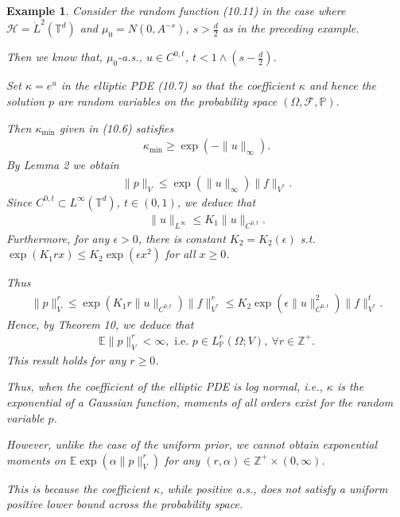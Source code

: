 \documentclass[oneside,11pt]{book}
\numberwithin{equation}{section}
\newtheorem{example}{Example}[section]
\begin{document}
\begin{example}
    Consider the random function (10.11) in the case where $\mathcal{H} = \dot{L}^2(\mathbb{T}^d)$ and $\mu_0 = N(0,A^{-s})$, $s > \frac{d}{2}$ as in the preceding example.
    
    Then we know that, $\mu_0$-a.s., $u\in C^{0,t}$, $t < 1\wedge\left(s - \frac{d}{2}\right)$.
    
    Set $\kappa = e^u$ in the elliptic PDE (10.7) so that the coefficient $\kappa$ and hence the solution $p$ are random variables on the probability space $(\Omega,\mathcal{F},\mathbb{P})$.
    
    Then $\kappa_{\min}$ given in (10.6) satisfies
    \begin{align*}
        \kappa_{\min}\ge\exp(-\|u\|_\infty).
    \end{align*}
    By Lemma 2 we obtain
    \begin{align*}
        \|p\|_V\le\exp(\|u\|_\infty)\|f\|_{V^*}.
    \end{align*}
    Since $C^{0,t}\subset L^\infty(\mathbb{T}^d)$, $t\in(0,1)$, we deduce that
    \begin{align*}
        \|u\|_{L^\infty}\le K_1\|u\|_{C^{0,t}}.
    \end{align*}
    Furthermore, for any $\epsilon > 0$, there is constant $K_2 = K_2(\epsilon)$ s.t. $\exp(K_1rx)\le K_2\exp(\epsilon x^2)$ for all $x\ge 0$.
    
    Thus
    \begin{align*}
        \|p\|_V^r\le\exp(K_1r\|u\|_{C^{0,t}})\|f\|_{V^*}^r\le K_2\exp(\epsilon\|u\|_{C^{0,t}}^2)\|f\|_{V^*}^t.
    \end{align*}
    Hence, by Theorem 10, we deduce that
    \begin{align*}
        \mathbb{E}\|p\|_V^r < \infty, \mbox{ i.e. } p\in L_{\mathbb{P}}^r(\Omega;V),\ \forall r\in\mathbb{Z}^+.
    \end{align*}
    This result holds for any $r\ge 0$.
    
    Thus, when the coefficient of the elliptic PDE is \emph{log normal}, i.e., $\kappa$ is the exponential of a Gaussian function, moments of all orders exist for the random variable $p$.
    
    However, unlike the case of the uniform prior, we cannot obtain exponential moments on $\mathbb{E}\exp(\alpha\|p\|_V^r)$ for any $(r,\alpha)\in\mathbb{Z}^+\times(0,\infty)$.
    
    This is because the coefficient $\kappa$, while positive a.s., does not satisfy a uniform positive lower bound across the probability space.
\end{example}
\end{document}
